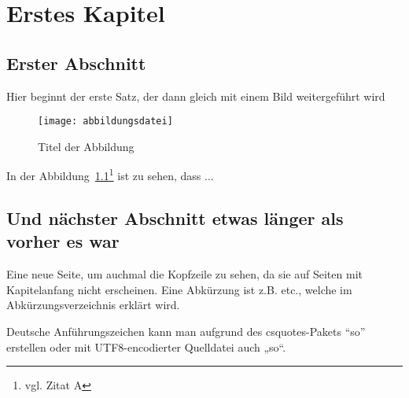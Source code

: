 \chapter{Erstes Kapitel}
\section{Erster Abschnitt}

Hier beginnt der erste Satz, der dann gleich mit einem Bild weitergeführt wird
\begin{figure}[htbp]
\centering
\texttt{[image: abbildungsdatei]} %
\caption{Titel der Abbildung} 
\label{fig:bild1}
\end{figure}

In der Abbildung~\ref{fig:bild1}\footnote{vgl. Zitat A\cite{referenzA}} %
ist zu sehen, dass ...

\newpage

\section{Und nächster Abschnitt etwas länger als vorher es war}
Eine neue Seite, um auchmal die Kopfzeile zu sehen, da sie auf Seiten mit Kapitelanfang nicht erscheinen. Eine Abkürzung ist z.B. etc., welche im 
Abkürzungsverzeichnis erklärt wird. 

Deutsche Anführungszeichen kann man aufgrund des csquotes-Pakets \enquote{so} erstellen oder mit UTF8-encodierter Quelldatei auch „so“.
